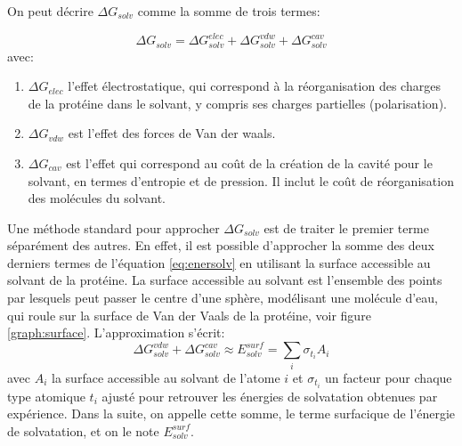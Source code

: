 On peut décrire $\Delta G_{solv}$ comme la somme de trois termes:

\begin{equation}
  \label{eq:enersolv}
  \Delta G_{solv} = \Delta G_{solv}^{elec} + \Delta G_{solv}^{vdw} + \Delta G_{solv}^{cav}
\end{equation}
avec:

\begin{enumerate}
\item $\Delta G_{elec}$ l'effet électrostatique, qui correspond à la réorganisation des charges de la protéine dans le solvant, y compris ses charges partielles (polarisation).
\item $\Delta G_{vdw}$ est l'effet des forces de Van der waals.
  \item $\Delta G_{cav}$ est l'effet qui correspond au coût de la création de la cavité pour le solvant, en termes d'entropie et de pression. Il inclut le coût de réorganisation des molécules du solvant.
\end{enumerate}

Une méthode standard pour approcher $\Delta G_{solv}$ est de traiter le premier terme séparément des autres. En effet, il est possible d'approcher la somme des deux derniers termes de l'équation  \ref{eq:enersolv} en utilisant la surface accessible au solvant de la protéine. La surface accessible au solvant est l'ensemble des points par lesquels peut passer le centre d'une sphère, modélisant une molécule d'eau, qui roule sur la surface de Van der Vaals de la protéine, voir figure \ref{graph:surface}. L'approximation s'écrit:
\begin{equation}
  \label{eq:SA}
\Delta G_{solv}^{vdw} + \Delta G_{solv}^{cav} \approx E_{solv}^{surf} = \sum_i \sigma_{t_i} A_i
\end{equation}
avec $A_i$ la surface accessible au solvant de l'atome $i$  et $\sigma_{t_i}$ un facteur pour chaque type atomique $t_i$ ajusté pour retrouver les énergies de solvatation obtenues par expérience.
Dans la suite, on appelle cette somme, le terme surfacique de l'énergie de solvatation, et on le note $E_{solv}^{surf}$.

